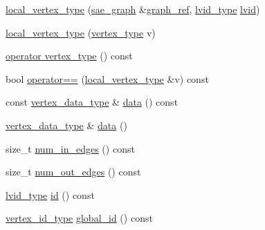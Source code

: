\begin{DoxyCompactItemize}
\item 
\hyperlink{structsaedb_1_1sae__graph_1_1local__vertex__type_aa4e6b5ae2e948ead53d196dc28001aa9}{local\-\_\-vertex\-\_\-type} (\hyperlink{classsaedb_1_1sae__graph}{sae\-\_\-graph} \&\hyperlink{structsaedb_1_1sae__graph_1_1local__vertex__type_ac373fad8819c0a5a52534d5446189b24}{graph\-\_\-ref}, \hyperlink{classsaedb_1_1sae__graph_afcd2ad6444e374e40a7a5ee4c46be052}{lvid\-\_\-type} \hyperlink{structsaedb_1_1sae__graph_1_1local__vertex__type_a551f1e6b9c35f4849cf009e7a4c8e058}{lvid})
\item 
\hyperlink{structsaedb_1_1sae__graph_1_1local__vertex__type_ae1ab00348eea5579a740188d9c6cafe8}{local\-\_\-vertex\-\_\-type} (\hyperlink{structsaedb_1_1sae__graph_1_1vertex__type}{vertex\-\_\-type} v)
\item 
\hyperlink{structsaedb_1_1sae__graph_1_1local__vertex__type_a583426d243309601dfe8a5b22cb22d20}{operator vertex\-\_\-type} () const 
\item 
bool \hyperlink{structsaedb_1_1sae__graph_1_1local__vertex__type_a9347dc78ff2409670e56f1d6f67e33e9}{operator==} (\hyperlink{structsaedb_1_1sae__graph_1_1local__vertex__type}{local\-\_\-vertex\-\_\-type} \&v) const 
\item 
const \hyperlink{classsaedb_1_1sae__graph_a8e9dfeb979f49c35d427f364fb3f69f5}{vertex\-\_\-data\-\_\-type} \& \hyperlink{structsaedb_1_1sae__graph_1_1local__vertex__type_af5fb61fb26a64a0fb92fe5eb358e5f86}{data} () const 
\item 
\hyperlink{classsaedb_1_1sae__graph_a8e9dfeb979f49c35d427f364fb3f69f5}{vertex\-\_\-data\-\_\-type} \& \hyperlink{structsaedb_1_1sae__graph_1_1local__vertex__type_a8d10ec334565da2d8b37e891fe7d933e}{data} ()
\item 
size\-\_\-t \hyperlink{structsaedb_1_1sae__graph_1_1local__vertex__type_a8c2cec89507a0b99984b8b8a47e8764e}{num\-\_\-in\-\_\-edges} () const 
\item 
size\-\_\-t \hyperlink{structsaedb_1_1sae__graph_1_1local__vertex__type_a2e5455d77068571e76da0c537c1a5c28}{num\-\_\-out\-\_\-edges} () const 
\item 
\hyperlink{classsaedb_1_1sae__graph_afcd2ad6444e374e40a7a5ee4c46be052}{lvid\-\_\-type} \hyperlink{structsaedb_1_1sae__graph_1_1local__vertex__type_a91b8f552cfc8e44ac94451885c95fdc8}{id} () const 
\item 
\hyperlink{classsaedb_1_1sae__graph_a2f9a7bf2db556689f1cd9de9562ff41f}{vertex\-\_\-id\-\_\-type} \hyperlink{structsaedb_1_1sae__graph_1_1local__vertex__type_afe11bce78674beedebb9bcc3a7547084}{global\-\_\-id} () const 

\end{DoxyCompactItemize}
